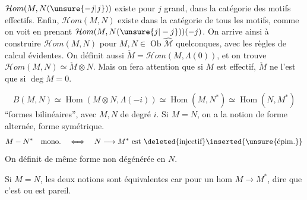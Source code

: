 $\mathcal Hom(M,N(\unsure{-j|j}))$ existe pour $j$ grand, dans la catégorie des motifs effectifs. Enfin, $\mathcal Hom(M,N)$ existe dans la catégorie de tous les motifs, comme on voit en prenant $\mathcal Hom(M,N(\unsure{j|-j}))(-j)$. On arrive ainsi à construire $\mathcal Hom(M,N)$ pour $M,N\in\operatorname{Ob}\widehat{\mathcal M}$ quelconques, avec les règles de calcul évidentes. On définit aussi $\check M=\mathcal Hom(M,\Lambda(0))$, et on trouve $\mathcal Hom(M,N)\simeq\check M\otimes N$. Mais on fera attention que si $M$ est effectif, $\check M$ ne l'est que si $\deg M=0$.

\[
B(M,N)\simeq\operatorname{Hom}(M\otimes N,\Lambda(-i))\simeq\operatorname{Hom}(M,N^{*})\simeq\operatorname{Hom}(N,M^{*})
\]
``formes bilinéaires'', avec $M,N$ de degré $i$.
Si $M=N$, on a la notion de forme alternée, forme symétrique.
\[
M\mathbin{-}N^{*}\quad\text{mono.}\quad\Longleftrightarrow\quad N\longrightarrow M^{*}\text{ est }\deleted{\text{injectif}}\inserted{\text{\unsure{épim.}}}
\]
On définit de même forme non dégénérée en $N$.

Si $M=N$, les deux notions sont équivalentes car  pour un hom $M\longrightarrow M^{*}$, dire que c'est  ou    est pareil.
